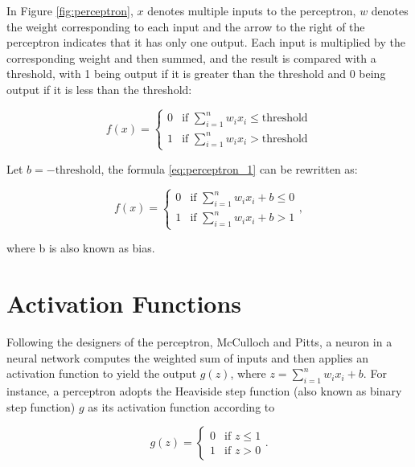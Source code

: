 \documentclass[
	parskip, 			   %
	twoside, 			   %
	DIV=14, 			   %
	BCOR=15.0mm, 		   %
	headsepline, 		   %
	open=right, 		   %
	captions=tableheading, %
	bibliography=totoc,    %
	numbers=noenddot       %
]{scrreprt}
\begin{document}
In Figure \ref{fig:perceptron}, $x$ denotes multiple inputs to the perceptron, $w$ denotes the weight corresponding to each input and the arrow to the right of the perceptron indicates that it has only one output. Each input is multiplied by the corresponding weight and then summed, and the result is compared with a threshold, with 1 being output if it is greater than the threshold and 0 being output if it is less than the threshold:

\begin{equation}
    \label{eq:perceptron_1}
    f(x)=\begin{cases}0 & \text{if } \sum\nolimits_{i=1}^n w_{i} x_{i} \leq \text{threshold} \\ 1 & \text{if } \sum\nolimits_{i=1}^n w_{i} x_{i}>\text{threshold}\end{cases}
\end{equation}

Let $b=-\text{threshold}$, the formula \ref{eq:perceptron_1} can be rewritten as:

\begin{equation}
    \label{eq:perceptron_2}
    f(x)=\begin{cases}0 & \text{if } \sum\nolimits_{i=1}^n w_{i} x_{i}+b \leq 0 \\ 1 & \text{if } \sum\nolimits_{i=1}^n w_{i} x_{i}+b>1\end{cases},
\end{equation}

where b is also known as bias. 

\section{Activation Functions}
Following the designers of the perceptron, McCulloch and Pitts, a neuron in a neural network computes the weighted sum of inputs and then applies an activation function to yield the output $g(z)$, where $z=\sum\nolimits_{i=1}^n w_{i} x_{i} + b$. For instance, a perceptron adopts the Heaviside step function (also known as binary step function) $g$ as its activation function according to

\begin{equation}
    \label{eq:activation_function}
    g(z)=\begin{cases} 0 & \text{if } z\leq 1 \\ 1  & \text{if } z>0
    \end{cases}.
\end{equation}
\end{document}
